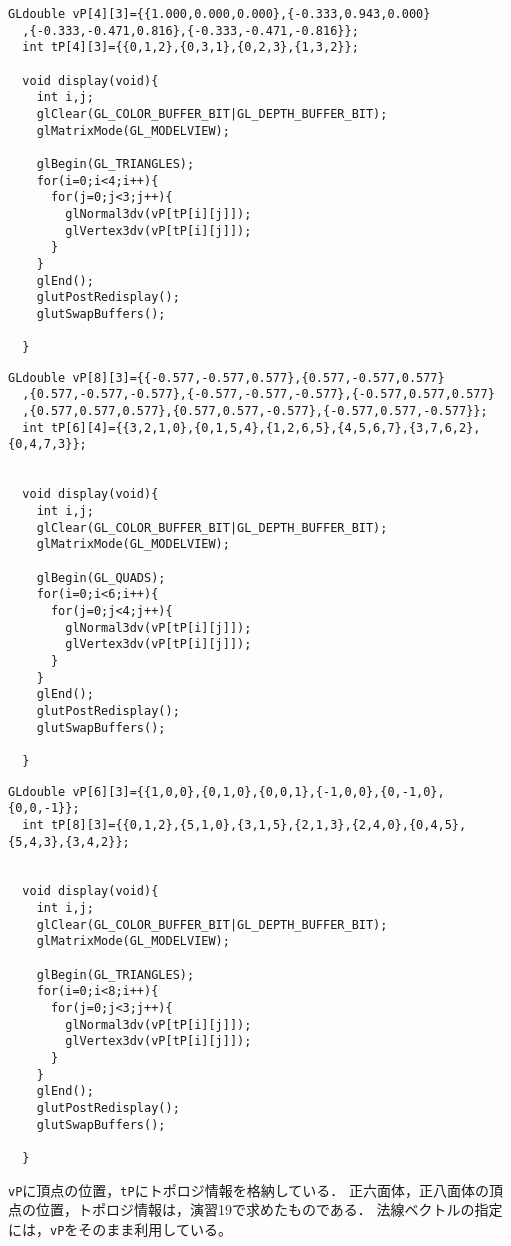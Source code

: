 \documentclass[]{jarticle}
\begin{document}
\begin{lstlisting}[caption=正四面体を描画するプログラム,label=seisimentai]
  GLdouble vP[4][3]={{1.000,0.000,0.000},{-0.333,0.943,0.000}
  ,{-0.333,-0.471,0.816},{-0.333,-0.471,-0.816}};
  int tP[4][3]={{0,1,2},{0,3,1},{0,2,3},{1,3,2}};
  
  void display(void){
    int i,j;
    glClear(GL_COLOR_BUFFER_BIT|GL_DEPTH_BUFFER_BIT);
    glMatrixMode(GL_MODELVIEW);
  
    glBegin(GL_TRIANGLES);
    for(i=0;i<4;i++){
      for(j=0;j<3;j++){
        glNormal3dv(vP[tP[i][j]]);
        glVertex3dv(vP[tP[i][j]]);
      }
    }
    glEnd();
    glutPostRedisplay();
    glutSwapBuffers();
  
  }
  \end{lstlisting}
\begin{lstlisting}[caption=正六面体を描画するプログラム,label=seirokumentai]
  GLdouble vP[8][3]={{-0.577,-0.577,0.577},{0.577,-0.577,0.577}
  ,{0.577,-0.577,-0.577},{-0.577,-0.577,-0.577},{-0.577,0.577,0.577}
  ,{0.577,0.577,0.577},{0.577,0.577,-0.577},{-0.577,0.577,-0.577}};
  int tP[6][4]={{3,2,1,0},{0,1,5,4},{1,2,6,5},{4,5,6,7},{3,7,6,2},{0,4,7,3}};
  
  
  void display(void){
    int i,j;
    glClear(GL_COLOR_BUFFER_BIT|GL_DEPTH_BUFFER_BIT);
    glMatrixMode(GL_MODELVIEW);
  
    glBegin(GL_QUADS);
    for(i=0;i<6;i++){
      for(j=0;j<4;j++){
        glNormal3dv(vP[tP[i][j]]);
        glVertex3dv(vP[tP[i][j]]);
      }
    }
    glEnd();
    glutPostRedisplay();
    glutSwapBuffers();
  
  }
  \end{lstlisting}
\begin{lstlisting}[caption=正八面体を描画するプログラム,label=seihatimentai]
  GLdouble vP[6][3]={{1,0,0},{0,1,0},{0,0,1},{-1,0,0},{0,-1,0},{0,0,-1}};
  int tP[8][3]={{0,1,2},{5,1,0},{3,1,5},{2,1,3},{2,4,0},{0,4,5},{5,4,3},{3,4,2}};
  
  
  void display(void){
    int i,j;
    glClear(GL_COLOR_BUFFER_BIT|GL_DEPTH_BUFFER_BIT);
    glMatrixMode(GL_MODELVIEW);
  
    glBegin(GL_TRIANGLES);
    for(i=0;i<8;i++){
      for(j=0;j<3;j++){
        glNormal3dv(vP[tP[i][j]]);
        glVertex3dv(vP[tP[i][j]]);
      }
    }
    glEnd();
    glutPostRedisplay();
    glutSwapBuffers();
  
  }
  \end{lstlisting}
\texttt{vP}に頂点の位置，\texttt{tP}にトポロジ情報を格納している．
正六面体，正八面体の頂点の位置，トポロジ情報は，演習19で求めたものである．
法線ベクトルの指定には，\texttt{vP}をそのまま利用している。
\end{document}
